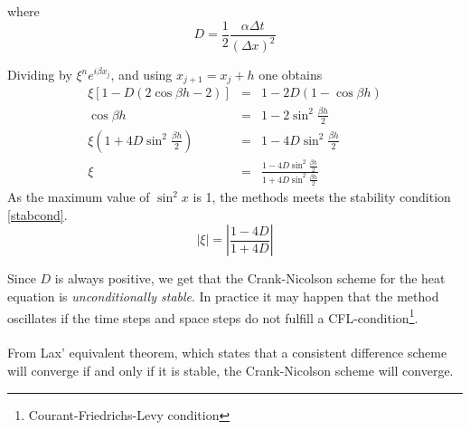 where
\begin{equation*}
D = \frac{1}{2}\frac{\alpha\Delta t}{(\Delta x)^2}
\label{eq:crank-D}
\end{equation*}

Dividing  by $\xi^ne^{i\beta x_j}$, and using $x_{j+1} = x_j + h$ one obtains    %
\begin{eqnarray*}
\xi\left[1-D\left(2\cos{\beta h} - 2\right)\right] &=& 1 - 2D\left(1-\cos{\beta h}\right) \\
\cos{\beta h} &=& 1-2\sin^2{\frac{\beta h}{2}} \\
\xi\left(1+4D\sin^{2}{\frac{\beta h}{2}}\right) &=& 1 - 4D\sin^2{\frac{\beta h}{2}} \\
\xi &=& \frac{1-4D\sin^2{\frac{\beta h}{2}}}{1+4D\sin^2{\frac{\beta h}{2}}}
\end{eqnarray*}
As the maximum value of $\sin^2{x}$ is 1, the methods meets the stability condition \ref{stabcond}.
\begin{equation}
|\xi | = \left|\frac{1-4D}{1+4D}\right|
\end{equation}

Since $D$ is always positive, we get that the Crank-Nicolson
scheme for the heat equation is \emph{unconditionally stable}. In practice it
may happen that the method oscillates if the time steps and space steps do not
fulfill a CFL-condition\footnote{Courant-Friedrichs-Levy condition}.
\\
\\
From Lax' equivalent theorem, which states that a consistent difference scheme will converge if and only if it is stable, the Crank-Nicolson scheme will converge.



